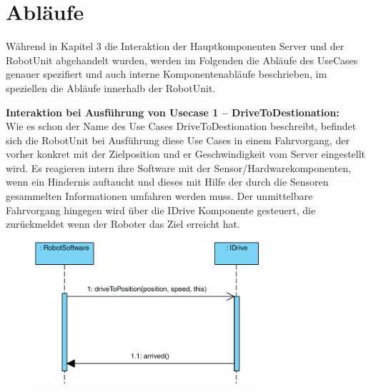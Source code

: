 \section{Abläufe}

Während in Kapitel 3 die Interaktion der Hauptkomponenten Server und der RobotUnit abgehandelt wurden, werden im Folgenden die Abläufe des UseCases genauer spezifiert und auch interne Komponentenabläufe beschrieben, im speziellen die Abläufe innerhalb der RobotUnit.
	
	\textbf{Interaktion bei Ausführung von Usecase 1 – DriveToDestionation:}\\
	Wie es schon der Name des Use Cases DriveToDestionation beschreibt, befindet sich die RobotUnit bei Ausführung diese Use Cases in einem Fahrvorgang, der vorher konkret mit der Zielposition und er Geschwindigkeit vom Server eingestellt wird. Es reagieren intern ihre Software mit der Sensor/Hardwarekomponenten, wenn ein Hindernis auftaucht und dieses mit Hilfe der durch die Sensoren gesammelten Informationen umfahren werden muss. Der unmittelbare Fahrvorgang hingegen wird über die IDrive Komponente gesteuert, die zurückmeldet wenn der Roboter das Ziel erreicht hat.
	\begin{figure}[H]
		\centering
		\includegraphics[width=0.75\textwidth]{img/8-driveToDest}
		\label{DriveToDestionation}
	\end{figure}
	
